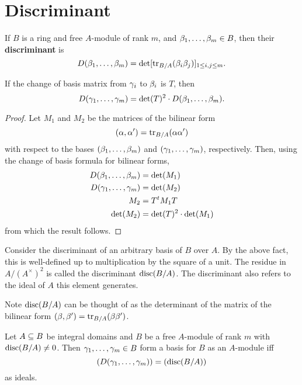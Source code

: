 \section{Discriminant}
\begin{df}
%
If $B$ is a ring and free $A$-module of rank $m$, and $\beta_1,\ldots, \beta_m\in B$, then their \textbf{discriminant} is
\[D(\beta_1,\ldots, \beta_m)=\det[\operatorname{tr}_{B/A}(\beta_i\beta_j)]_{1\leq i,j\leq m}.\]

\begin{pr}
If the change of basis matrix from $\gamma_i$ to $\beta_i$ is $T$, then 
\[D(\gamma_1,\ldots, \gamma_m)=\det(T)^2\cdot D(\beta_1,\ldots, \beta_m).\] 
\end{pr}
\begin{proof}
Let $M_1$ and $M_2$ be the matrices of the bilinear form
\[
(\alpha,\alpha')=\operatorname{tr}_{B/A}(\alpha\alpha')
\]
with respect to the bases $(\beta_1,\ldots, \beta_m)$ and $(\gamma_1,\ldots, \gamma_m)$, respectively.
Then, using the change of basis formula for bilinear forms,
\begin{align*}
D(\beta_1,\ldots, \beta_m) &= \det(M_1)\\
D(\gamma_1,\ldots, \gamma_m) &=\det(M_2)\\
M_2&=T^tM_1T\\
\det(M_2)&=\det(T)^2\cdot \det(M_1)
\end{align*}
from which the result follows.
\end{proof}

Consider the discriminant of an arbitrary basis of $B$ over $A$. 
By the above fact, this is well-defined up to multiplication by the square of a unit. The residue in $A/(A^{\times})^2$ is called the discriminant $\operatorname{disc}(B/A)$. The discriminant also refers to the ideal of $A$ this element generates.

Note $\operatorname{disc}(B/A)$ can be thought of as the determinant of the matrix of the bilinear form $(\beta,\beta')=\operatorname{tr}_{B/A}(\beta\beta')$.
\end{df}
\begin{pr}
Let $A\subseteq B$ be integral domains and $B$ be a free $A$-module of rank $m$ with $\operatorname{disc}(B/A)\neq 0$. Then $\gamma_1,\ldots, \gamma_m\in B$ form a basis for $B$ as an $A$-module iff
\[(D(\gamma_1,\ldots, \gamma_m))=(\operatorname{disc}(B/A))\]
as ideals.
\end{pr}
